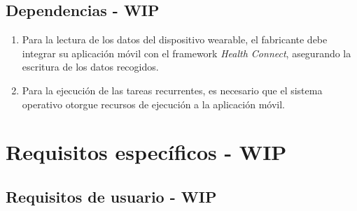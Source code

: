     \subsection{Dependencias - WIP}
        \label{req:descripcion:dependencias}
        
        \begin{enumerate}[label=\textbf{DEP-\arabic*}]
            \item Para la lectura de los datos del dispositivo \gls{wearable}, el fabricante debe integrar su aplicación móvil con el \gls{framework} \textit{Health Connect}, asegurando la escritura de los datos recogidos.
            \item Para la ejecución de las tareas recurrentes, es necesario que el sistema operativo otorgue recursos de ejecución a la aplicación móvil.
        \end{enumerate}

\section{Requisitos específicos - WIP}
    \label{req:especificos}
    
    \subsection{Requisitos de usuario - WIP}
        \label{req:especificos:usuarios}

